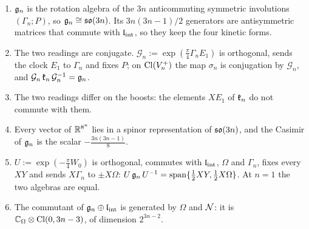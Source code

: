 \begin{theorem}
\label{thm:everyrung}
\begin{enumerate}[label=(\roman*),leftmargin=2.2em,itemsep=1pt]
\item $\mathfrak g_n$ is the rotation algebra of the $3n$ anticommuting symmetric involutions $(\Gamma_n;P)$, so $\mathfrak g_n\cong\mathfrak{so}(3n)$. Its
$3n(3n-1)/2$ generators are antisymmetric matrices that commute with $\mathfrak l_{\rm int}$, so they keep the four kinetic forms.
\item The two readings are conjugate. $\mathcal G_n:=\exp(\tfrac\pi4\Gamma_nE_1)$ is orthogonal, sends the clock $E_1$ to $\Gamma_n$ and fixes
$P$; on $\mathrm{Cl}(V^+_n)$ the map $\sigma_n$ is conjugation by $\mathcal G_n$, and $\mathcal G_n\,\mathfrak k_n\,\mathcal G_n^{-1}=\mathfrak g_n$.
\item The two readings differ on the boosts: the elements $XE_1$ of $\mathfrak k_n$ do not commute with them.
\item Every vector of $\mathbb{R}^{8^n}$ lies in a spinor representation of $\mathfrak{so}(3n)$, and the Casimir of $\mathfrak g_n$ is the scalar $-\tfrac{3n(3n-1)}8$.
\item $U:=\exp(-\tfrac\pi4W_0)$ is orthogonal, commutes with $\mathfrak l_{\rm int}$, $\Omega$ and $\Gamma_n$, fixes every $XY$ and sends $X\Gamma_n$ to
$\pm X\Omega$: $U\,\mathfrak g_n\,U^{-1}=\mathrm{span}\{\tfrac12 XY,\tfrac12 X\Omega\}$. At $n=1$ the two algebras are equal.
\item The commutant of $\mathfrak g_n\oplus\mathfrak l_{\rm int}$ is generated by $\Omega$ and $\mathcal N$: it is $\mathbb{C}_\Omega\otimes\mathrm{Cl}(0,3n-3)$, of dimension $2^{3n-2}$.
\end{enumerate}
\end{theorem}

